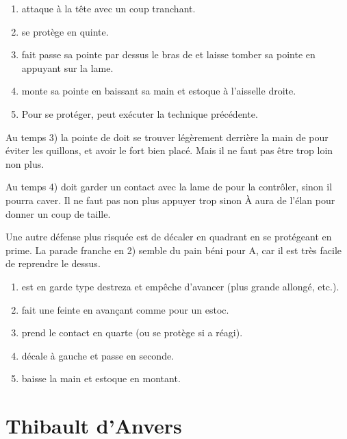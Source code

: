\begin{technique}

\begin{enumerate}
	\item \A attaque \D à la tête avec un coup tranchant.
	\item \D se protège en quinte.
	\item \D fait passe sa pointe par dessus le bras de \A et laisse tomber sa pointe en appuyant sur la lame.
	\item \D monte sa pointe en baissant sa main et estoque \A à l'aisselle droite.
	\item Pour se protéger, \A peut exécuter la technique précédente.
\end{enumerate}

Au temps 3) la pointe de \D doit se trouver légèrement derrière la main de \A pour éviter les quillons, et avoir le fort bien placé. Mais il ne faut pas être trop loin non plus.

Au temps 4) \D doit garder un contact avec la lame de \A pour la contrôler, sinon il pourra caver. Il ne faut pas non plus appuyer trop sinon À aura de l'élan pour donner un coup de taille.

Une autre défense plus risquée est de décaler en quadrant en se protégeant en prime.
La parade franche en 2) semble du pain béni pour A, car il est très facile de reprendre le dessus.

\end{technique}


\begin{technique}

\begin{enumerate}
	\item \A est en garde type destreza et empêche \D d'avancer (plus grande allongé, etc.).
	\item \D fait une feinte en avançant comme pour un estoc.
	\item \D prend le contact en quarte (ou se protège si \A a réagi).
	\item \D décale à gauche et passe en seconde.
	\item \D baisse la main et estoque en montant.
\end{enumerate}

\end{technique}


\section{Thibault d'Anvers}


